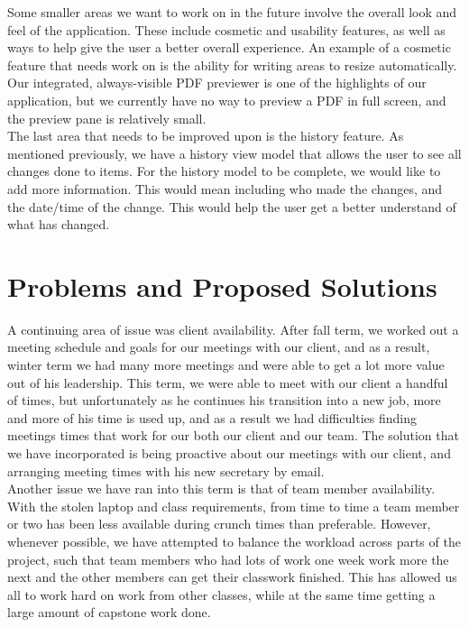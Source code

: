 \documentclass[onecolumn, draftclsnofoot,10pt, compsoc]{IEEEtran}
\begin{document}
\noindent Some smaller areas we want to work on in the future involve the overall look and feel of the application.
These include cosmetic and usability features, as well as ways to help give the user a better overall experience.
An example of a cosmetic feature that needs work on is the ability for writing areas
to resize automatically. Our integrated, always-visible PDF previewer is one of the highlights of our
application, but we currently have no way to preview a PDF in full screen, and the preview pane is relatively small. \\

\noindent The last area that needs to be improved upon is the history feature. As mentioned previously,
we have a history view model that allows the user to see all changes done to items. For the history model
to be complete, we would like to add more information. This would mean including who made the changes,
and the date/time of the change. This would help the user get a better understand of what has changed. \\

\newpage

\section{Problems and Proposed Solutions}

\noindent A continuing area of issue was client availability. After fall term, we worked out a meeting schedule
and goals for our meetings with our client, and as a result, winter term we had many more meetings and
were able to get a lot more value out of his leadership. This term, we were able to meet with
our client a handful of times, but unfortunately as he continues his transition into a new job,
more and more of his time is used up, and as a result we had difficulties finding
meetings times that work for our both our client and our team. The solution that we have incorporated is being proactive about our meetings with our client, and arranging meeting times with his new secretary by email.\\

\noindent Another issue we have ran into this term is that of team member availability.
With the stolen laptop and class requirements, from time to time a team member or two has been less
available during crunch times than preferable. However, whenever possible, we have attempted to
balance the workload across parts of the project, such that team members who had lots of work one week
work more the next and the other members can get their classwork finished. This has allowed us all
to work hard on work from other classes, while at the same time getting a large amount of
capstone work done. \\
\end{document}
